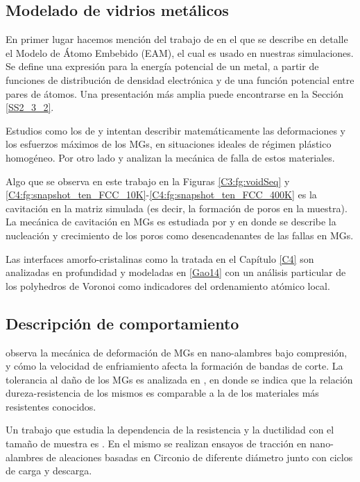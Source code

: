 \subsection{Modelado de vidrios metálicos}
\label{S1_3_1}

En primer lugar hacemos mención del trabajo de \cite{daw84} en el que se describe en detalle el Modelo de Átomo Embebido (EAM), el cual es usado en nuestras simulaciones. Se define una expresión para la energía potencial de un metal, a partir de funciones de distribución de densidad electrónica y de una función potencial entre pares de átomos. Una presentación más amplia puede encontrarse en la Sección \ref{SS2_3_2}.

Estudios como los de \cite{Wisitsorasak12} y \cite{cheng11} intentan describir matemáticamente las deformaciones y los esfuerzos máximos de los MGs, en situaciones ideales de régimen plástico homogéneo. Por otro lado \cite{Chen11} y \cite{Egami11} analizan la mecánica de falla de estos materiales.

Algo que se observa en este trabajo en la Figuras \ref{C3:fg:voidSeq} y \ref{C4:fg:snapshot_ten_FCC_10K}-\ref{C4:fg:snapshot_ten_FCC_400K} es la cavitación en la matriz simulada (es decir, la formación de poros en la muestra). La mecánica de cavitación en MGs es estudiada por \cite{Huang13} y \cite{guan13} en donde se describe la nucleación y crecimiento de los poros como desencadenantes de las fallas en MGs.

Las interfaces amorfo-cristalinas como la tratada en el Capítulo \ref{C4} son analizadas en profundidad y modeladas en \ref{Gao14} con un análisis particular de los polyhedros de Voronoi como indicadores del ordenamiento atómico local.

\subsection{Descripción de comportamiento}
\label{S1_3_2}

\cite{xiao12} observa la mecánica de deformación de MGs en nano-alambres bajo compresión, y cómo la velocidad de enfriamiento afecta la formación de bandas de corte. La tolerancia al daño de los MGs es analizada en \cite{Demetriou11}, en donde se indica que la relación dureza-resistencia de los mismos es comparable a la de los materiales más resistentes conocidos.

Un trabajo que estudia la dependencia de la resistencia y la ductilidad con el tamaño de muestra es \cite{Dongchan10}. En el mismo se realizan ensayos de tracción en nano-alambres de aleaciones basadas en Circonio de diferente diámetro junto con ciclos de carga y descarga.

